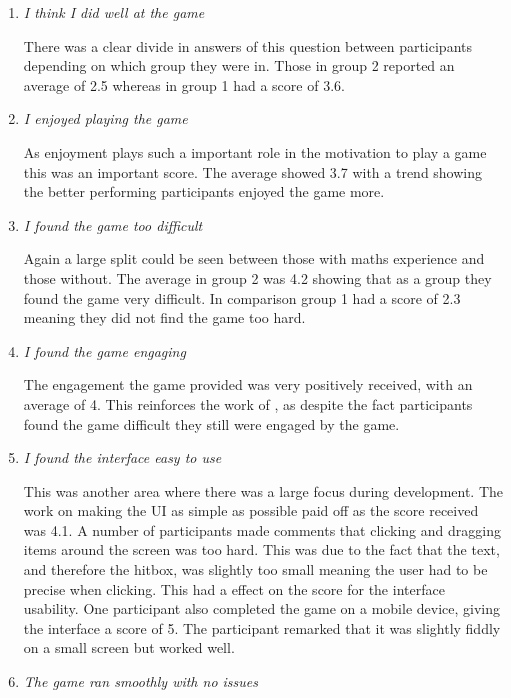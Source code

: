 \documentclass[12pt,a4paper]{report}
\begin{document}
\begin{enumerate}
	\item  \textit {I think I did well at the game}
	
	There was a clear divide in answers of this question between participants depending on which group they were in. Those in group 2 reported an average of 2.5 whereas in group 1 had a score of 3.6. 
	
	\item  \textit {I enjoyed playing the game}
	
	As enjoyment plays such a important role in the motivation to play a game this was an important score. The average showed 3.7 with a trend showing the better performing participants enjoyed the game more. 
	
	\item  \textit {I found the game too difficult}
	
	Again a large split could be seen between those with maths experience and those without. The average in group 2 was 4.2 showing that as a group they found the game very difficult. In comparison group 1 had a score of 2.3 meaning they did not find the game too hard.
	
	\item  \textit {I found the game engaging}
	
	The engagement the game provided was very positively received, with an average of 4. This reinforces the work of \cite{abuhamdeh2012importance}, as despite the fact participants found the game difficult they still were engaged by the game.
	
	\item  \textit {I found the interface easy to use}

This was another area where there was a large focus during development. The work on making the UI as simple as possible paid off as the score received was 4.1. A number of participants made comments that clicking and dragging items around the screen was too hard. This was due to the fact that the text, and therefore the hitbox, was slightly too small meaning the user had to be precise when clicking. This had a effect on the score for the interface usability. One participant also completed the game on a mobile device, giving the interface a score of 5. The participant remarked that it was slightly fiddly on a small screen but worked well.
	
	\item  \textit {The game ran smoothly with no issues}
	

\end{enumerate}
\end{document}
